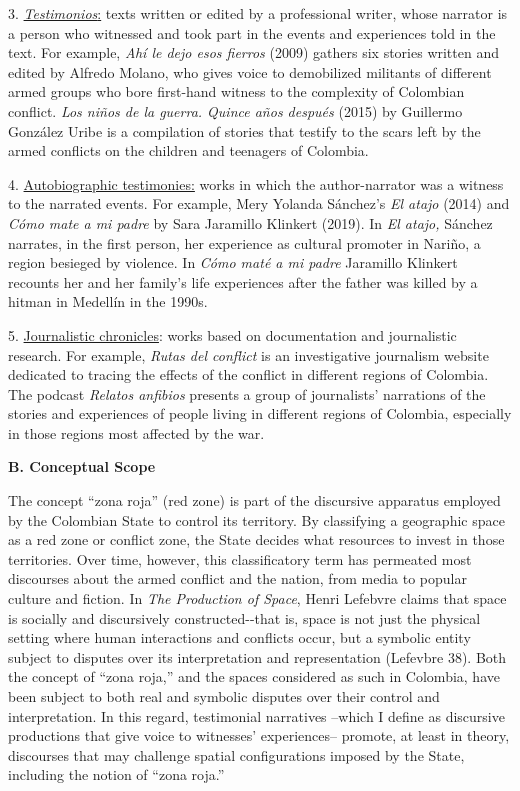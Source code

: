 \documentclass[
  11pt,
,
onecolumn,
openany
]{book}
\begin{document}
3. \underline{\emph{Testimonios}:} texts written or edited by a professional
writer, whose narrator is a person who witnessed and took part in the events
and experiences told in the text. For example, \emph{Ahí le dejo esos fierros}
(2009) gathers six stories written and edited by Alfredo Molano, who gives
voice to demobilized militants of different armed groups who bore first-hand
witness to the complexity of Colombian conflict. \emph{Los niños de la guerra.
Quince años después} (2015) by Guillermo González Uribe is a compilation of
stories that testify to the scars left by the armed conflicts on the children
and teenagers of Colombia.

4. \underline{Autobiographic testimonies:} works in which the author-narrator
was a witness to the narrated events. For example, Mery Yolanda Sánchez's
\emph{El atajo} (2014) and \emph{Cómo mate a mi padre} by Sara Jaramillo
Klinkert (2019). In \emph{El atajo,} Sánchez narrates, in the first person,
her experience as cultural promoter in Nariño, a region besieged by violence.
In \emph{Cómo maté a mi padre} Jaramillo Klinkert recounts her and her
family's life experiences after the father was killed by a hitman in Medellín
in the 1990s.

5. \underline{Journalistic chronicles}: works based on documentation and
journalistic research. For example, \emph{Rutas del conflict} is an
investigative journalism website dedicated to tracing the effects of the
conflict in different regions of Colombia. The podcast \emph{Relatos anfibios}
presents a group of journalists' narrations of the stories and experiences of
people living in different regions of Colombia, especially in those regions
most affected by the war.

\textbf{B. Conceptual Scope}

The concept ``zona roja'' (red zone) is part of the discursive apparatus
employed by the Colombian State to control its territory. By classifying a
geographic space as a red zone or conflict zone, the State decides what
resources to invest in those territories. Over time, however, this
classificatory term has permeated most discourses about the armed conflict and
the nation, from media to popular culture and fiction. In \emph{The Production
of Space}, Henri Lefebvre claims that space is socially and discursively
constructed-\/-that is, space is not just the physical setting where human
interactions and conflicts occur, but a symbolic entity subject to disputes
over its interpretation and representation (Lefevbre 38). Both the concept of
``zona roja,'' and the spaces considered as such in Colombia, have been
subject to both real and symbolic disputes over their control and
interpretation. In this regard, testimonial narratives --which I define as
discursive productions that give voice to witnesses' experiences-- promote, at
least in theory, discourses that may challenge spatial configurations imposed
by the State, including the notion of ``zona roja.''
\end{document}
